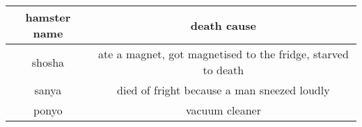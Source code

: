 \documentclass{article}
\begin{document}
\begin{tabular}{|c|c|}
\hline
hamster name & death cause \\
\hline
shosha & ate a magnet, got magnetised to the fridge, starved to death \\
\hline
sanya & died of fright because a man sneezed loudly \\
\hline
ponyo & vacuum cleaner \\
\hline
\end{tabular}
\end{document}
